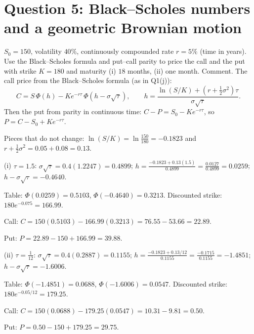 \section{Question 5: Black--Scholes numbers and a geometric Brownian motion}

\begin{problem}[Q5(a)]
$S_0=150$, volatility $40\%$, continuously compounded rate $r=5\%$ (time in years). Use the Black--Scholes formula and put--call parity to price the call and the put with strike $K=180$ and maturity (i) $18$ months, (ii) one month. Comment.
\cardsays The call price from the Black--Scholes formula (as in Q1(j)):
\[
C=S\,\Phi(h)-Ke^{-r\tau}\,\Phi(h-\sigma\sqrt\tau),\qquad h=\frac{\ln(S/K)+(r+\frac12\sigma^2)\tau}{\sigma\sqrt\tau}.
\]
\cardsays Then the put from parity in continuous time: $C-P=S_0-Ke^{-r\tau}$, so $P=C-S_0+Ke^{-r\tau}$.
\working
\begin{steps}
\item Pieces that do not change: $\ln(S/K)=\ln\frac{150}{180}=-0.1823$ and $r+\frac12\sigma^2=0.05+0.08=0.13$.
\item (i) $\tau=1.5$: $\sigma\sqrt\tau=0.4(1.2247)=0.4899$; $h=\frac{-0.1823+0.13(1.5)}{0.4899}=\frac{0.0127}{0.4899}=0.0259$; $h-\sigma\sqrt\tau=-0.4640$.
\item Table: $\Phi(0.0259)=0.5103$, $\Phi(-0.4640)=0.3213$. Discounted strike: $180e^{-0.075}=166.99$.
\item Call: $C=150(0.5103)-166.99(0.3213)=76.55-53.66=22.89$.
\item Put: $P=22.89-150+166.99=39.88$.
\item (ii) $\tau=\frac1{12}$: $\sigma\sqrt\tau=0.4(0.2887)=0.1155$; $h=\frac{-0.1823+0.13/12}{0.1155}=\frac{-0.1715}{0.1155}=-1.4851$; $h-\sigma\sqrt\tau=-1.6006$.
\item Table: $\Phi(-1.4851)=0.0688$, $\Phi(-1.6006)=0.0547$. Discounted strike: $180e^{-0.05/12}=179.25$.
\item Call: $C=150(0.0688)-179.25(0.0547)=10.31-9.81=0.50$.
\item Put: $P=0.50-150+179.25=29.75$.
\end{steps}
\end{problem}

